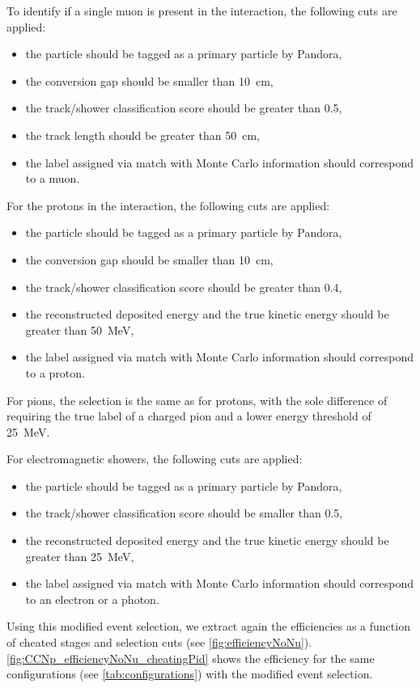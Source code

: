 \noindent
To identify if a single muon is present in the interaction, the following cuts are applied: \begin{itemize}
    \item the particle should be tagged as a primary particle by Pandora,
    \item the conversion gap should be smaller than \SI{10}{\cm},
    \item the track/shower classification score should be greater than 0.5,
    \item the track length should be greater than \SI{50}{\cm},
    \item the label assigned via match with Monte Carlo information should correspond to a muon. 
\end{itemize}
For the protons in the interaction, the following cuts are applied: \begin{itemize}
    \item the particle should be tagged as a primary particle by Pandora,
    \item the conversion gap should be smaller than \SI{10}{\cm},
    \item the track/shower classification score should be greater than 0.4,
    \item the reconstructed deposited energy and the true kinetic energy should be greater than \SI{50}{\MeV},
    \item the label assigned via match with Monte Carlo information should correspond to a proton.
\end{itemize}
For pions, the selection is the same as for protons, with the sole difference of requiring the true label of a charged pion and a lower energy threshold of \SI{25}{\MeV}. 

\noindent
For electromagnetic showers, the following cuts are applied: \begin{itemize}
    \item the particle should be tagged as a primary particle by Pandora,
    \item the track/shower classification score should be smaller than 0.5,
    \item the reconstructed deposited energy and the true kinetic energy should be greater than \SI{25}{\MeV},
    \item the label assigned via match with Monte Carlo information should correspond to an electron or a photon. 
\end{itemize} 


Using this modified event selection, we extract again the efficiencies as a function of cheated stages and selection cuts (see \autoref{fig:efficiencyNoNu}). \autoref{fig:CCNp_efficiencyNoNu_cheatingPid} shows the efficiency for the same configurations (see \autoref{tab:configurations}) with the modified event selection. 

